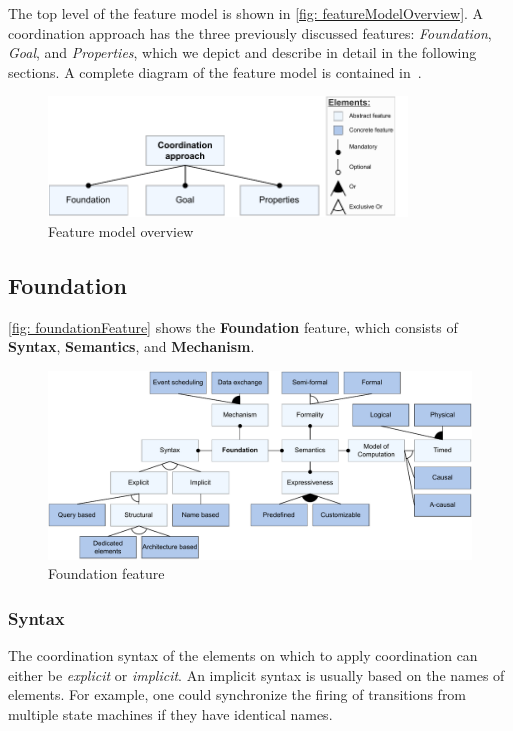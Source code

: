 \documentclass[runningheads]{llncs}
\begin{document}
The top level of the feature model is shown in \autoref{fig: featureModelOverview}.
A coordination approach has the three previously discussed features: \textit{Foundation}, \textit{Goal}, and \textit{Properties}, which we depict and describe in detail in the following sections.
A complete diagram of the feature model is contained in~\cite{timkrauterArtifactsCoordination2024}.

\begin{figure}[ht]
	\centering
	\includegraphics[width=0.85\textwidth]{images/root}
	\caption{Feature model overview}
	\label{fig: featureModelOverview}
\end{figure}

\subsection{Foundation}

\autoref{fig: foundationFeature} shows the \textbf {Foundation} feature, which consists of \textbf{Syntax}, \textbf{Semantics}, and \textbf{Mechanism}.

\begin{figure}[ht]
	\centering
	\includegraphics[width=1\textwidth]{images/foundation_feature}
	\caption{Foundation feature}
	\label{fig: foundationFeature}
\end{figure}

\subsubsection{Syntax} The coordination syntax of the elements on which to apply coordination can either be \textit{explicit} or \textit{implicit}.
An implicit syntax is usually based on the names of elements.
For example, one could synchronize the firing of transitions from multiple state machines if they have identical names.
\end{document}

